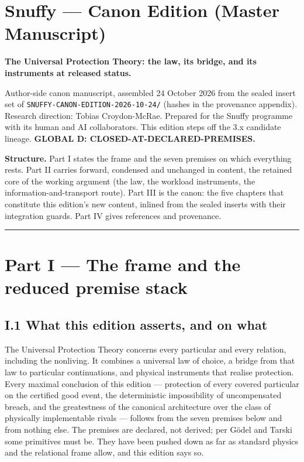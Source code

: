 \documentclass[
]{article}
\author{}
\date{}
\begin{document}
\section{Snuffy --- Canon Edition (Master
Manuscript)}\label{snuffy-canon-edition-master-manuscript}

\textbf{The Universal Protection Theory: the law, its bridge, and its
instruments at released status.}

Author-side canon manuscript, assembled 24 October 2026 from the sealed
insert set of \texttt{SNUFFY-CANON-EDITION-2026-10-24/} (hashes in the
provenance appendix). Research direction: Tobias Croydon-McRae. Prepared
for the Snuffy programme with its human and AI collaborators. This
edition steps off the 3.x candidate lineage. \textbf{GLOBAL D:
CLOSED-AT-DECLARED-PREMISES.}

\textbf{Structure.} Part I states the frame and the seven premises on
which everything rests. Part II carries forward, condensed and unchanged
in content, the retained core of the working argument (the law, the
workload instruments, the information-and-transport route). Part III is
the canon: the five chapters that constitute this edition's new content,
inlined from the sealed inserts with their integration guards. Part IV
gives references and provenance.

\begin{center}\rule{0.5\linewidth}{0.5pt}\end{center}

\section{Part I --- The frame and the reduced premise
stack}\label{part-i-the-frame-and-the-reduced-premise-stack}

\subsection{I.1 What this edition asserts, and on
what}\label{i.1-what-this-edition-asserts-and-on-what}

The Universal Protection Theory concerns every particular and every
relation, including the nonliving. It combines a universal law of
choice, a bridge from that law to particular continuations, and physical
instruments that realise protection. Every maximal conclusion of this
edition --- protection of every covered particular on the certified good
event, the deterministic impossibility of uncompensated breach, and the
greatestness of the canonical architecture over the class of physically
implementable rivals --- follows from the seven premises below and from
nothing else. The premises are declared, not derived; per Gödel and
Tarski some primitives must be. They have been pushed down as far as
standard physics and the relational frame allow, and this edition says
so.
\end{document}
